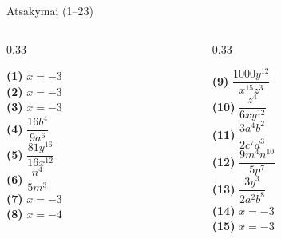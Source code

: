 \documentclass[aspectratio=169,10pt]{beamer}
\begin{document}
\begin{frame}{Atsakymai (1--23)}

    \begin{columns}[T]

        \begin{column}{0.33\textwidth}

            \small

            \textbf{(1)} $x=-3$ \\[3pt]

            \textbf{(2)} $x=-3$ \\[3pt]

            \textbf{(3)} $x=-3$ \\[3pt]

            \textbf{(4)}
            $\dfrac{16b^4}{9a^6}$ \\[5pt]

            \textbf{(5)}
            $\dfrac{81y^{16}}{16x^{12}}$ \\[5pt]

            \textbf{(6)}
            $\dfrac{n^4}{5m^3}$ \\[5pt]

            \textbf{(7)} $x=-3$ \\[3pt]

            \textbf{(8)} $x=-4$

        \end{column}

        \begin{column}{0.33\textwidth}

            \small

            \textbf{(9)}
            $\dfrac{1000y^{12}}{x^{15}z^3}$ \\[5pt]

            \textbf{(10)}
            $\dfrac{z^4}{6xy^{12}}$ \\[5pt]

            \textbf{(11)}
            $\dfrac{3a^4b^2}{2c^7d^3}$ \\[5pt]

            \textbf{(12)}
            $\dfrac{9m^4n^{10}}{5p^7}$ \\[5pt]

            \textbf{(13)}
            $\dfrac{3y^3}{2a^2b^8}$ \\[5pt]

            \textbf{(14)} $x=-3$ \\[3pt]

            \textbf{(15)} $x=-3$ \\[3pt]


\end{column}
\end{columns}
\end{frame}
\end{document}
